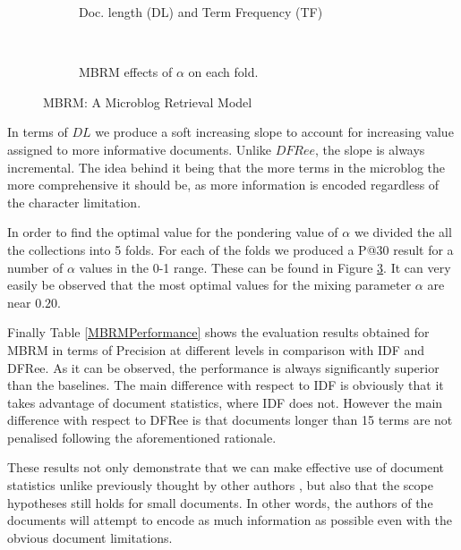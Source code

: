 \begin{figure}
	\begin{subfigure}[]{0.5\textwidth}
		\caption{Doc. length (DL) and Term Frequency (TF)}
		
		\label{microblogRM}
	\end{subfigure} 
	~
	\begin{subfigure}[]{0.5\textwidth}
		\caption{MBRM effects of $\alpha$ on each fold.}
		
		\label{microblogRM-param}
	\end{subfigure} 
	\caption{MBRM: A Microblog Retrieval Model}
\end{figure} 

In terms of $DL$ we produce a soft increasing slope to account for increasing value assigned to more informative documents. Unlike $DFRee$, the slope is always incremental. The idea behind it being that the more terms in the microblog the more comprehensive it should be, as more information is encoded regardless of the character limitation.

In order to find the optimal value for the pondering value of $\alpha$ we divided the all the collections into 5 folds. For each of the folds we produced a P@30 result for a number of $\alpha$ values in the 0-1 range. These can be found in Figure \ref{microblogRM-param}. It can very easily be observed that the most optimal values for the mixing parameter $\alpha$ are near $0.20$.

Finally Table \ref{MBRMPerformance} shows the evaluation results obtained for MBRM in terms of Precision at different levels in comparison with IDF and DFRee. As it can be observed, the performance is always significantly superior than the baselines. The main difference with respect to IDF is obviously that it takes advantage of document statistics, where IDF does not. However the main difference with respect to DFRee is that documents longer than 15 terms are not penalised following the aforementioned rationale. 

These results not only demonstrate that we can make effective use of document statistics unlike previously thought by other authors \cite{naveed2011searching}, but also that the scope hypotheses still holds for small documents. In other words, the authors of the documents will attempt to encode as much information as possible even with the obvious document limitations. 



